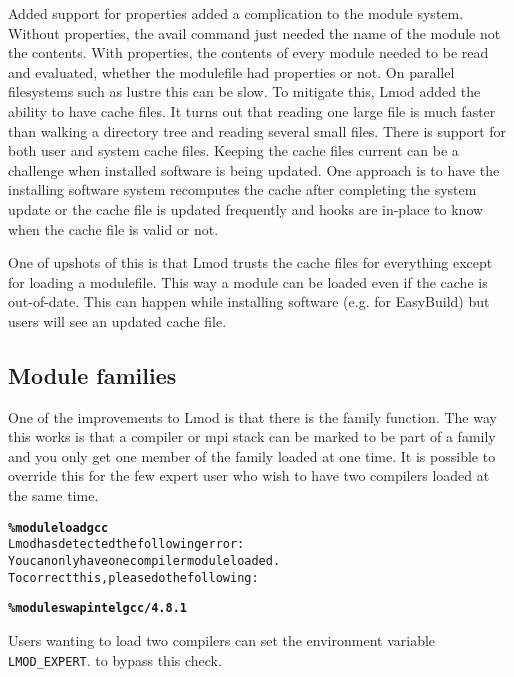 Added support for properties added a complication to the module
system.  Without properties, the avail command just needed the name of
the module not the contents.  With properties, the contents of every
module needed to be read and evaluated, whether the modulefile had
properties or not. On parallel filesystems such as lustre this can be
slow.  To mitigate this, Lmod added the ability to have cache files.
It turns out that reading one large file is much faster than walking a
directory tree and reading several small files.  There is support for
both user and system cache files.  Keeping the cache files current can
be a challenge when installed software is being updated.  One approach
is to have the installing software system recomputes the cache after
completing the system update or the cache file is updated frequently
and hooks are in-place to know when the cache file is valid or not.

One of upshots of this is that Lmod trusts the cache files for
everything except for loading a modulefile.  This way a module can be
loaded even if the cache is out-of-date.  This can happen while
installing software (e.g. for EasyBuild) but users will see an updated
cache file.


\subsection{Module families}

One of the improvements to Lmod is that there is the family function.
The way this works is that a compiler or mpi stack can be marked to be
part of a family and you only get one member of the family loaded at
one time.  It is possible to override this for the few expert user who
wish to have two compilers loaded at the same time.

{\small\begin{alltt}  \textbf{\% module load gcc}
  Lmod has detected the following error:
  You can only have one compiler module loaded.
  To correct this, please do the following:

  \textbf{\% module swap intel gcc/4.8.1}\end{alltt}}
\noindent
Users wanting to load two compilers can set the environment variable
\texttt{LMOD\_EXPERT}. to bypass this check.





